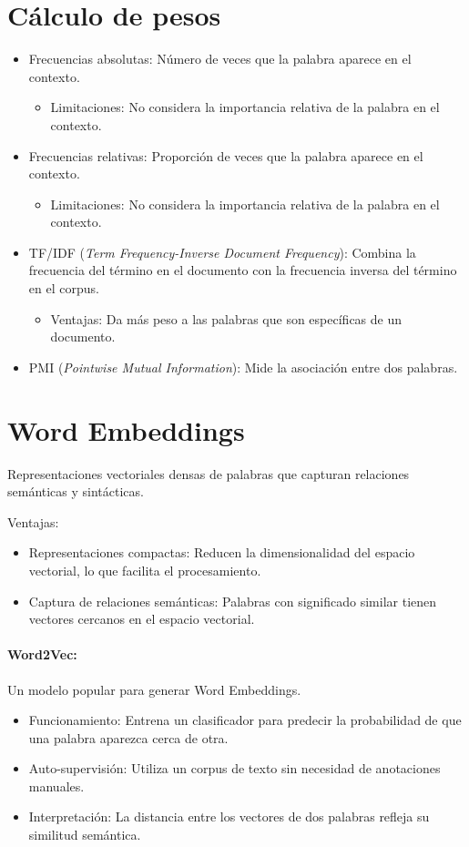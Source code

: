 \documentclass{report}
\begin{document}
\section {Cálculo de pesos}
\begin{itemize}
    \item Frecuencias absolutas: Número de veces que la palabra aparece en el contexto.
    \begin{itemize}
        \item Limitaciones: No considera la importancia relativa de la palabra en el contexto.
    \end{itemize}
    \item Frecuencias relativas: Proporción de veces que la palabra aparece en el contexto.
    \begin{itemize}
        \item Limitaciones: No considera la importancia relativa de la palabra en el contexto.
    \end{itemize}
    \item TF/IDF (\textit{Term Frequency-Inverse Document Frequency}): Combina la frecuencia del término en el documento con la frecuencia inversa del término en el corpus.
    \begin{itemize}
        \item Ventajas: Da más peso a las palabras que son específicas de un documento.
    \end{itemize}
    \item PMI (\textit{Pointwise Mutual Information}): Mide la asociación entre dos palabras.
\end{itemize}

\section{Word Embeddings}
 Representaciones vectoriales densas de palabras que capturan relaciones semánticas y sintácticas.
 
Ventajas:
\begin{itemize}
    \item Representaciones compactas: Reducen la dimensionalidad del espacio vectorial, lo que facilita el procesamiento.
    \item Captura de relaciones semánticas: Palabras con significado similar tienen vectores cercanos en el espacio vectorial.
\end{itemize}

\paragraph{Word2Vec:} Un modelo popular para generar Word Embeddings.
\begin{itemize}
    \item Funcionamiento: Entrena un clasificador para predecir la probabilidad de que una palabra aparezca cerca de otra.
    \item Auto-supervisión: Utiliza un corpus de texto sin necesidad de anotaciones manuales.
    \item Interpretación: La distancia entre los vectores de dos palabras refleja su similitud semántica.
\end{itemize}
\end{document}
